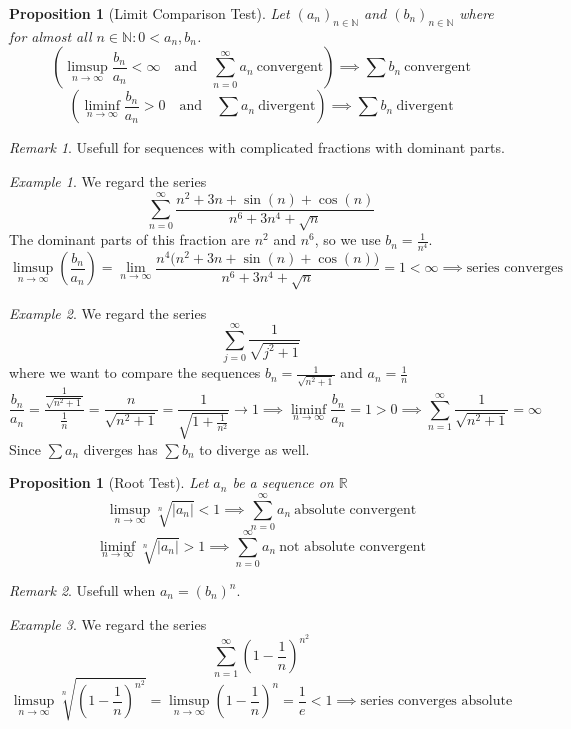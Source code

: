 \documentclass[english,titlepage]{uzhpub}
\theoremstyle{definition}
\theoremstyle{plain}
\newtheorem{proposition}[definition]{Proposition}
\theoremstyle{remark}
\newtheorem*{remark}{Remark}
\theoremstyle{example}
\newtheorem*{example}{Example}
\begin{document}
   \begin{proposition}[Limit Comparison Test]\label{pro:vergleichskriterium}
      Let \((a_n)_{n \in \mathbb{N}}\) and \((b_n)_{n \in \mathbb{N}}\) where for almost all \(n \in \mathbb{N}: 0 < a_n, b_n\).
      \begin{equation}\label{eq:bn_convergent}
         \left(\limsup_{n \to \infty} \frac{b_n}{a_n} < \infty \quad\text{and}\quad \sum_{n=0}^\infty a_n~\text{convergent}\right) \implies \sum b_n~\text{convergent}
      \end{equation}
      \begin{equation}\label{eq:bn_divergent}
         \left(\liminf_{n \to \infty} \frac{b_n}{a_n} > 0 \quad\text{and}\quad \sum a_n~\text{divergent}\right) \implies \sum b_n~\text{divergent}
      \end{equation}
   \end{proposition}
   \begin{remark}
      Usefull for sequences with complicated fractions with dominant parts.
   \end{remark}
   \begin{example}
      We regard the series
      \[\sum_{n=0}^\infty \frac{n^2 + 3n + \sin(n) + \cos(n)}{n^6 + 3n^4 + \sqrt{n}}\]
      The dominant parts of this fraction are \(n^2\) and \(n^6\), so we use \(b_n = \frac{1}{n^4}\).
      \[\limsup_{n \to \infty} \left(\frac{b_n}{a_n}\right) = \lim_{n \to \infty} \frac{n^4 \big(n^2 + 3n + \sin(n) + \cos(n)\big)}{n^6 + 3n^4 + \sqrt{n}} = 1 < \infty \implies \text{series converges}\]
   \end{example}
   \begin{example}
      We regard the series
      \[\sum_{j=0}^\infty \frac{1}{\sqrt{j^2 + 1}}\]
      where we want to compare the sequences \(b_n = \frac{1}{\sqrt{n^2 + 1}}\) and \(a_n = \frac{1}{n}\)
      \[\frac{b_n}{a_n} = \frac{\frac{1}{\sqrt{n^2 + 1}}}{\frac{1}{n}} = \frac{n}{\sqrt{n^2 + 1}} = \frac{1}{\sqrt{1 + \frac{1}{n^2}}} \to 1 \implies \liminf_{n \to \infty} \frac{b_n}{a_n} = 1 > 0 \implies \sum_{n=1}^\infty \frac{1}{\sqrt{n^2 + 1}} = \infty\]
      Since \(\sum a_n\) diverges has \(\sum b_n\) to diverge as well.
   \end{example}

   \begin{proposition}[Root Test]\label{pro:root_test}
      Let \(a_n\) be a sequence on \(\mathbb{R}\)
      \[\limsup_{n \to \infty} \sqrt[n]{|a_n|} < 1 \implies \sum_{n=0}^\infty a_n~\text{absolute convergent}\]
      \[\liminf_{n \to \infty} \sqrt[n]{|a_n|} > 1 \implies \sum_{n=0}^\infty a_n~\text{not absolute convergent}\]
   \end{proposition}
   \begin{remark}
      Usefull when \(a_n = (b_n)^n\).
   \end{remark}
   \begin{example}
      We regard the series
      \[\sum_{n=1}^\infty \left(1 - \frac{1}{n}\right)^{n^2}\]
      \[\limsup_{n \to \infty} \sqrt[n]{\left(1 - \frac{1}{n}\right)^{n^2}} = \limsup_{n \to \infty} \left(1 - \frac{1}{n}\right)^n = \frac{1}{e} < 1 \implies \text{series converges absolute}\]
   \end{example}
\end{document}
